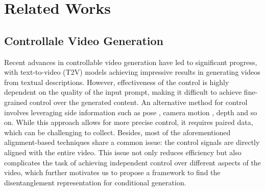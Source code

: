 \section{Related Works}
\vspace{-0.1cm}
\subsection{Controllale Video Generation}
Recent advances in controllable video generation have led to significant progress, with text-to-video (T2V) models \citep{yang2024cogvideox,singer2022make,ho2022video,zhou2022magicvideo,opensora} achieving impressive results in generating videos from textual descriptions. However,
effectiveness of the control is highly dependent on the quality of the input prompt, making it difficult to achieve fine-grained control over the generated content. An alternative method for control involves leveraging side information such as pose \citep{tu2024stableanimator, zhu2025champ}, camera motion \citep{yang2024direct, wang2024motionctrl}, depth \citep{liu2024stablev2v, xing2024make} and so on. While this approach allows for more precise control, it requires paired data, which can be challenging to collect. 
Besides, most of the aforementioned alignment-based techniques share a common issue: the control signals are directly aligned with the entire video. This issue not only reduces efficiency but also complicates the task of achieving independent control over different aspects of the video, which further motivates us to propose a framework to find the disentanglement representation for conditional generation.


